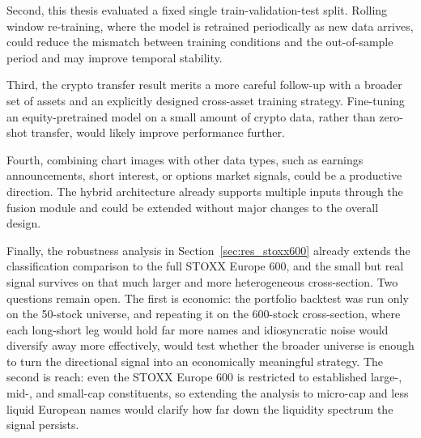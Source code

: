 Second, this thesis evaluated a fixed single train-validation-test split. Rolling window re-training, where the model is retrained periodically as new data arrives, could reduce the mismatch between training conditions and the out-of-sample period and may improve temporal stability.

Third, the crypto transfer result merits a more careful follow-up with a broader set of assets and an explicitly designed cross-asset training strategy. Fine-tuning an equity-pretrained model on a small amount of crypto data, rather than zero-shot transfer, would likely improve performance further.

Fourth, combining chart images with other data types, such as earnings announcements, short interest, or options market signals, could be a productive direction. The hybrid architecture already supports multiple inputs through the fusion module and could be extended without major changes to the overall design.

Finally, the robustness analysis in Section~\ref{sec:res_stoxx600} already extends the classification comparison to the full STOXX Europe 600, and the small but real signal survives on that much larger and more heterogeneous cross-section. Two questions remain open. The first is economic: the portfolio backtest was run only on the 50-stock universe, and repeating it on the 600-stock cross-section, where each long-short leg would hold far more names and idiosyncratic noise would diversify away more effectively, would test whether the broader universe is enough to turn the directional signal into an economically meaningful strategy. The second is reach: even the STOXX Europe 600 is restricted to established large-, mid-, and small-cap constituents, so extending the analysis to micro-cap and less liquid European names would clarify how far down the liquidity spectrum the signal persists.

